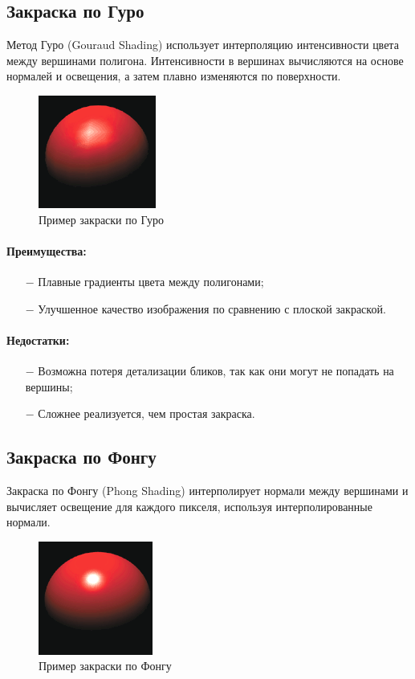 \subsection{Закраска по Гуро}

Метод Гуро (Gouraud Shading) использует интерполяцию интенсивности цвета между вершинами полигона. Интенсивности в вершинах вычисляются на основе нормалей и освещения, а затем плавно изменяются по поверхности.

\begin{figure}[H]
    \centering
    \includegraphics[width=0.2\linewidth]{img/1-4-2-gouraud.png}
    \caption{Пример закраски по Гуро}
    \label{fig:1-4-2-gouraud}
\end{figure}

\paragraph{Преимущества:}
\begin{itemize}
	\item[$-$] Плавные градиенты цвета между полигонами;
    \item[$-$] Улучшенное качество изображения по сравнению с плоской закраской.
\end{itemize}
\paragraph{Недостатки:}
\begin{itemize}
	\item[$-$] Возможна потеря детализации бликов, так как они могут не попадать на вершины;
    \item[$-$] Сложнее реализуется, чем простая закраска.
\end{itemize}

\subsection{Закраска по Фонгу}

Закраска по Фонгу (Phong Shading) интерполирует нормали между вершинами и вычисляет освещение для каждого пикселя, используя интерполированные нормали.

\begin{figure}[H]
    \centering
    \includegraphics[width=0.2\linewidth]{img/1-4-3-phong.png}
    \caption{Пример закраски по Фонгу}
    \label{fig:1-4-3-phong}
\end{figure}

